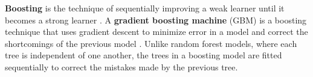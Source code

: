 \documentclass{article}
\begin{document}

	\textbf{Boosting} is the technique of sequentially improving a weak learner until it becomes a strong learner \cite{schapire1990strength}. A \textbf{gradient boosting machine} (GBM) is a boosting technique that uses gradient descent to minimize error in a model and correct the shortcomings of the previous model \cite{friedman2001greedy}. Unlike random forest models, where each tree is independent of one another, the trees in a boosting model are fitted sequentially to correct the mistakes made by the previous tree.
	
\end{document}
